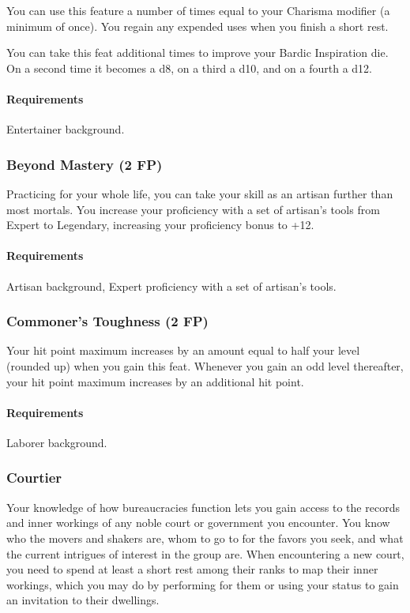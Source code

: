     You can use this feature a number of times equal to your Charisma modifier (a minimum of once).
    You regain any expended uses when you finish a short rest.

    You can take this feat additional times to improve your Bardic Inspiration die.
    On a second time it becomes a d8, on a third a d10, and on a fourth a d12.

    \paragraph{Requirements} Entertainer background.
\subsubsection{Beyond Mastery (2 FP)} \label{feat::beyondmastery}
    Practicing for your whole life, you can take your skill as an artisan further than most mortals.
    You increase your proficiency with a set of artisan's tools from Expert to Legendary, increasing your proficiency bonus to +12.
    \paragraph{Requirements} Artisan background, Expert proficiency with a set of artisan's tools.
\subsubsection{Commoner's Toughness (2 FP)} \label{feat::commonerstoughness}
    Your hit point maximum increases by an amount equal to half your level (rounded up) when you gain this feat.
    Whenever you gain an odd level thereafter, your hit point maximum increases by an additional hit point.
    \paragraph{Requirements} Laborer background.
\subsubsection{Courtier} \label{feat::courtier}
    Your knowledge of how bureaucracies function lets you gain access to the records and inner workings of any noble court or government you encounter.
    You know who the movers and shakers are, whom to go to for the favors you seek, and what the current intrigues of interest in the group are.
    When encountering a new court, you need to spend at least a short rest among their ranks to map their inner workings, which you may do by performing for them or using your status to gain an invitation to their dwellings.

